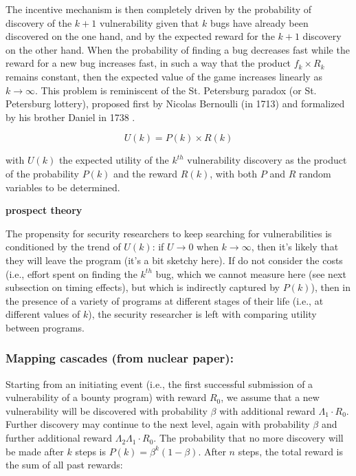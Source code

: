 The incentive mechanism is then completely driven by the probability of discovery of the $k+1$ vulnerability given that $k$ bugs have already been discovered on the one hand, and by the expected reward for the $k+1$ discovery on the other hand. When the probability of finding a bug decreases fast while the reward for a new bug increases fast, in such a way that the product $f_k \times R_k$ remains constant, then the expected value of the game increases linearly as $k \rightarrow \infty$. This problem is reminiscent of the St. Petersburg paradox (or St. Petersburg lottery), proposed first by Nicolas Bernoulli (in 1713)  and formalized by his brother Daniel in 1738 \cite{}.

\begin{equation}
\label{ }
U(k) = P(k) \times R(k)
\end{equation}

with $U(k)$ the expected utility of the $k^{th}$ vulnerability discovery as the product of the probability $P(k)$ and the reward $R(k)$, with both $P$ and $R$ random variables to be determined.

{\bf prospect theory \cite{kanehman}}

The propensity for security researchers to keep searching for vulnerabilities is conditioned by the trend of $U(k)$: if $U \rightarrow 0$ when $k \rightarrow \infty$, then it's likely that they will leave the program (it's a bit sketchy here). If do not consider the costs (i.e., effort spent on finding the $k^{th}$ bug, which we cannot measure here (see next subsection on timing effects), but which is indirectly captured by $P(k)$), then in the presence of a variety of programs at different stages of their life (i.e., at different values of $k$), the security researcher is left with comparing utility between programs.


\subsubsection{Mapping cascades (from nuclear paper):}

Starting from an initiating event (i.e., the first successful submission of a vulnerability of a bounty program) with reward $R_{0}$, we assume that a new vulnerability will be discovered with probability $\beta$ with additional reward $\Lambda_1 \cdot R_{0}$. Further discovery  may continue to the next level, again with 
probability $\beta$ and further additional reward $ \Lambda_2 \Lambda_1 \cdot R_{0}$. The probability that no more discovery will be made after $k$ steps is $P(k) = \beta^{k} (1-\beta)$. After $n$ steps, the total reward is the sum of all past rewards: 

